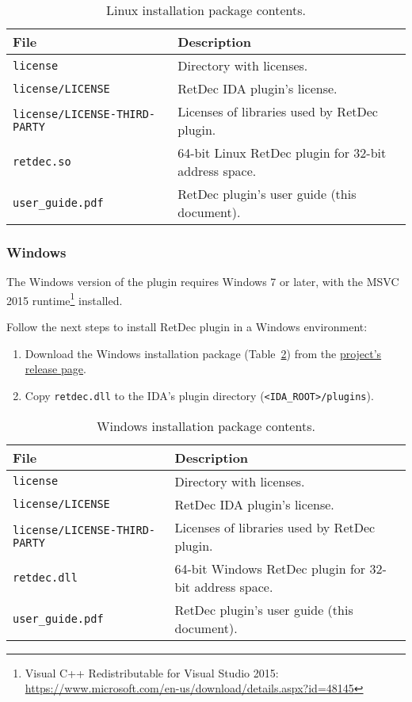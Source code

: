 \documentclass[pdftex, a4paper,12pt, oneside, svgnames]{article}
\begin{document}
\begin{table}[!ht]
\centering
\caption{Linux installation package contents.}
\label{table:installation-package-linux}
\begin{tabular}{ll}
\textbf{File} & \textbf{Description}\\
\hline
\texttt{license} & Directory with licenses. \\
\texttt{license/LICENSE} & RetDec IDA plugin's license. \\
\texttt{license/LICENSE-THIRD-PARTY} & Licenses of libraries used by RetDec plugin. \\
\texttt{retdec.so} & 64-bit Linux RetDec plugin for 32-bit address space. \\
\texttt{user_guide.pdf} & RetDec plugin's user guide (this document). \\
\end{tabular}
\end{table}

\subsubsection{Windows}
\label{sec:installation:windows}
The Windows version of the plugin requires Windows 7 or later, with the MSVC 2015 runtime\footnote{Visual C++ Redistributable for Visual Studio 2015: \url{https://www.microsoft.com/en-us/download/details.aspx?id=48145}} installed.

Follow the next steps to install RetDec plugin in a Windows environment:
\begin{enumerate}
	\item Download the Windows installation package (Table~\ref{table:installation-package-windows}) from the \href{https://github.com/avast-tl/retdec-idaplugin/releases}{project's release page}.
	\item Copy \texttt{retdec.dll} to the IDA's plugin directory (\texttt{<IDA\_ROOT>/plugins}).
\end{enumerate}

\begin{table}[!ht]
\centering
\caption{Windows installation package contents.}
\label{table:installation-package-windows}
\begin{tabular}{ll}
\textbf{File} & \textbf{Description}\\
\hline
\texttt{license} & Directory with licenses. \\
\texttt{license/LICENSE} & RetDec IDA plugin's license. \\
\texttt{license/LICENSE-THIRD-PARTY} & Licenses of libraries used by RetDec plugin. \\
\texttt{retdec.dll} & 64-bit Windows RetDec plugin for 32-bit address space. \\
\texttt{user_guide.pdf} & RetDec plugin's user guide (this document). \\
\end{tabular}
\end{table}
\end{document}
